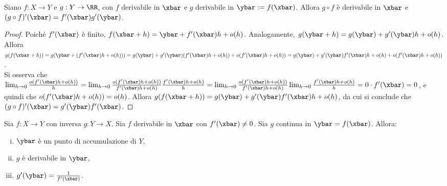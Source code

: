 \documentclass[11pt]{article}
\begin{document}
	\begin{proposition}
		Siano $f : X \to Y$ e $g : Y \to \RR$, con $f$ derivabile in $\xbar$ e $g$ derivabile in $\ybar := f(\xbar)$. Allora $g \circ f$ è
		derivabile in $\xbar$ e $(g \circ f)'(\xbar) = f'(\xbar) g'(\ybar)$.
	\end{proposition}

	\begin{proof}
		Poiché $f'(\xbar)$ è finito, $f(\xbar + h) = \ybar + f'(\xbar) h + o(h)$. Analogamente, $g(\ybar + h) = g(\ybar) + g'(\ybar) h + o(h)$.
		Allora $g(f(\xbar + h)) = g(\ybar + (f'(\xbar) h + o(h))) =
		g(\ybar) + g'(\ybar) (f'(\xbar) h + o(h)) + o(f'(\xbar) h + o(h)) =
		g(\ybar) + g'(\ybar) f'(\xbar) h + o(h) + o(f'(\xbar) h + o(h))$. \\
		
		Si osserva che $\lim_{h \to 0} \frac{o(f'(\xbar) h + o(h))}{h} =
		\lim_{h \to 0} \frac{o(f'(\xbar) h + o(h))}{f'(\xbar) h + o(h)} \frac{f'(\xbar) h + o(h)}{h} = \lim_{h \to 0} \frac{o(f'(\xbar) h + o(h))}{f'(\xbar) h + o(h)} \lim_{h \to 0} \frac{f'(\xbar) h + o(h)}{h} =
		0 \cdot f'(\xbar) = 0$, e quindi che $o(f'(\xbar) h + o(h)) = o(h)$.
		Allora $g(f(\xbar + h)) = g(\ybar) + g'(\ybar) f'(\xbar) h + o(h)$,
		da cui si conclude che $(g \circ f)'(\xbar) = g'(\ybar) f'(\xbar)$.
	\end{proof}

	\begin{proposition}
		Sia $f : X \to Y$ con inversa $g : Y \to X$. Sia $f$ derivabile
		in $\xbar$ con $f'(\xbar) \neq 0$. Sia $g$ continua in $\ybar = f(\xbar)$. Allora:
		
		\begin{enumerate}[(i)]
			\item $\ybar$ è un punto di accumulazione di $Y$,
			\item $g$ è derivabile in $\ybar$,
			\item $g'(\ybar) = \frac{1}{f'(\xbar)}$.
		\end{enumerate}
	\end{proposition}
\end{document}
